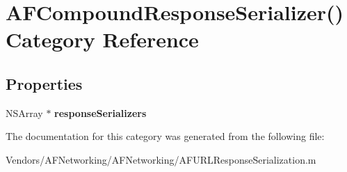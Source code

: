 \hypertarget{category_a_f_compound_response_serializer_07_08}{}\section{A\+F\+Compound\+Response\+Serializer() Category Reference}
\label{category_a_f_compound_response_serializer_07_08}
\subsection*{Properties}
\begin{DoxyCompactItemize}
\item 
\hypertarget{category_a_f_compound_response_serializer_07_08_a98e93971964f9964ec57bbbf28211577}{}N\+S\+Array $\ast$ {\bfseries response\+Serializers}\label{category_a_f_compound_response_serializer_07_08_a98e93971964f9964ec57bbbf28211577}

\end{DoxyCompactItemize}


The documentation for this category was generated from the following file\+:\begin{DoxyCompactItemize}
\item 
Vendors/\+A\+F\+Networking/\+A\+F\+Networking/A\+F\+U\+R\+L\+Response\+Serialization.\+m\end{DoxyCompactItemize}
